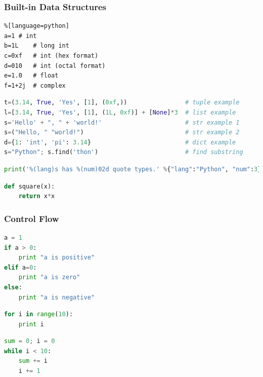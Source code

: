\begin{frame}[fragile]
  \MyLogo
  \frametitle{Built-in Data Structures}  
\small

\smallskip
{}
\begin{lstlisting}%[language=python]
a=1	# int
b=1L 	# long int
c=0xf	# int (hex format)
d=010	# int (octal format)
e=1.0	# float
f=1+2j	# complex
\end{lstlisting}

\begin{lstlisting}[language=python]
t=(3.14, True, 'Yes', [1], (0xf,))                # tuple example
l=[3.14, True, 'Yes', [1], (1L, 0xf)] + [None]*3  # list example
s='Hello' + ", " + 'world!'                       # str example 1
s=("Hello, " "world!")                            # str example 2
d={1: 'int', 'pi': 3.14}                          # dict example
s="Python"; s.find('thon')                        # find substring
\end{lstlisting}

\begin{lstlisting}[language=python]
print('%(lang)s has %(num)02d quote types.' %{"lang":"Python", "num":3})
\end{lstlisting}

\begin{lstlisting}[language=python]
def square(x):
	return x*x
\end{lstlisting}

\end{frame}


\begin{frame}[fragile]
  \MyLogo
  \frametitle{Control Flow}  
\small

\medskip
{}
\begin{lstlisting}[language=python]
a = 1
if a > 0:
	print "a is positive"
elif a=0:
	print "a is zero"
else:
	print "a is negative"
\end{lstlisting}			

\begin{lstlisting}[language=python]
for i in range(10):
	print i
\end{lstlisting}	
	
\begin{lstlisting}[language=python]
sum = 0; i = 0
while i < 10:
	sum += i
	i += 1
\end{lstlisting}

\end{frame}

